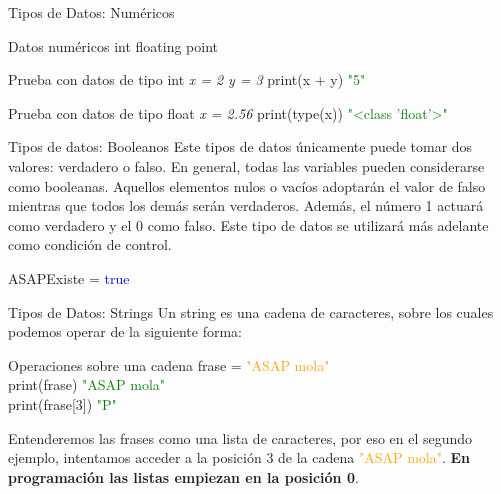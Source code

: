 \documentclass{beamer}
\begin{document}
\begin{frame} {Tipos de Datos: Numéricos}
\label{datos:numericos}
\begin{block}{Datos numéricos}
int
floating point
\end{block}
\begin{Programexample}{Prueba con datos de tipo int}
\centering
\textit{x = 2}\newline
\textit{y = 3}\newline
print(x + y) \newline
\textcolor{green}{"5"}
\end{Programexample}
\begin{Programexample}{Prueba con datos de tipo float}
\centering\textit{x = 2.56}\newline
print(type(x)) \newline
\textcolor{green}{"<class 'float'>"}
\end{Programexample}
\end{frame}

\begin{frame}{Tipos de datos: Booleanos}
\label{datos:booleanos}
Este tipos de datos únicamente puede tomar dos valores: verdadero o falso. En general, todas las variables pueden considerarse como booleanas. Aquellos elementos nulos o vacíos adoptarán el valor de falso mientras que todos los demás serán verdaderos. Además, el número 1 actuará como verdadero y el 0 como falso.
Este tipo de datos se utilizará más adelante como condición de control.
\begin{Programexample}
\centering 
ASAPExiste = \textcolor{blue}{true}
\end{Programexample}
\end{frame}

\begin{frame} {Tipos de Datos: Strings}
\label{datos:strings}
Un string es una cadena de caracteres, sobre los cuales podemos operar de la siguiente forma:
\begin{Programexample} {Operaciones sobre una cadena}
frase = \textcolor{orange}{"ASAP mola"}\\
print(frase) \hspace{2.7cm} \textcolor{green}{"ASAP mola"}\\
print(frase[3])\hspace{2.4cm} \textcolor{green}{"P"}
\end{Programexample}
Entenderemos las frases como una lista de caracteres, por eso en el segundo ejemplo, intentamos acceder a la posición 3 de la cadena  \textcolor{orange}{"ASAP mola"}.
\textbf{En programación las listas empiezan en la posición 0}.
\end{frame}
\end{document}
